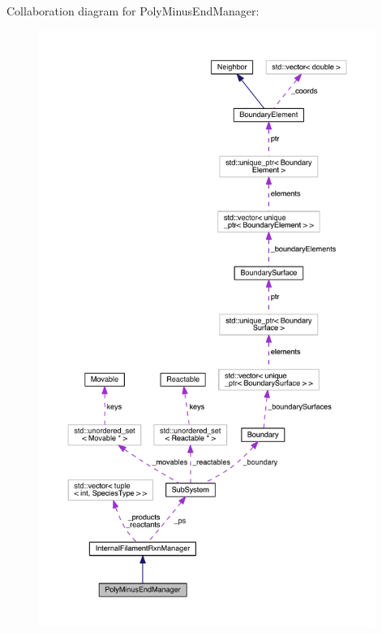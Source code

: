 Collaboration diagram for Poly\+Minus\+End\+Manager\+:\nopagebreak
\begin{figure}[H]
\begin{center}
\leavevmode
\includegraphics[height=550pt]{classPolyMinusEndManager__coll__graph}
\end{center}
\end{figure}
